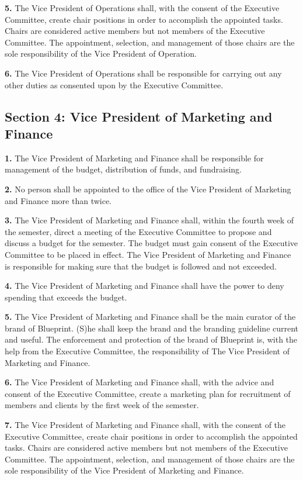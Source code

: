 \documentclass{article}
\begin{document}
\textbf{5.} The Vice President of Operations shall, with the consent of the Executive Committee, create chair positions in order to accomplish the appointed tasks. Chairs are considered active members but not members of the Executive Committee. The appointment, selection, and management of those chairs are the sole responsibility of the Vice President of Operation.

\textbf{6.} The Vice President of Operations shall be responsible for carrying out any other duties as consented upon by the Executive Committee.

\subsection{Section 4: Vice President of Marketing and Finance}

\textbf{1.} The Vice President of Marketing and Finance shall be responsible for management of the budget, distribution of funds, and fundraising.

\textbf{2.} No person shall be appointed to the office of the Vice President of Marketing and Finance more than twice.

\textbf{3.} The Vice President of Marketing and Finance shall, within the fourth week of the semester, direct a meeting of the Executive Committee to propose and discuss a budget for the semester. The budget must gain consent of the Executive Committee to be placed in effect. The Vice President of Marketing and Finance is responsible for making sure that the budget is followed and not exceeded.

\textbf{4.} The Vice President of Marketing and Finance shall have the power to deny spending that exceeds the budget.

\textbf{5.} The Vice President of Marketing and Finance shall be the main curator of the brand of Blueprint. (S)he shall keep the brand and the branding guideline current and useful. The enforcement and protection of the brand of Blueprint is, with the help from the Executive Committee, the responsibility of The Vice President of Marketing and Finance.

\textbf{6.} The Vice President of Marketing and Finance shall, with the advice and consent of the Executive Committee, create a marketing plan for recruitment of members and clients by the first week of the semester.

\textbf{7.} The Vice President of Marketing and Finance shall, with the consent of the Executive Committee, create chair positions in order to accomplish the appointed tasks. Chairs are considered active members but not members of the Executive Committee. The appointment, selection, and management of those chairs are the sole responsibility of the Vice President of Marketing and Finance.
\end{document}
